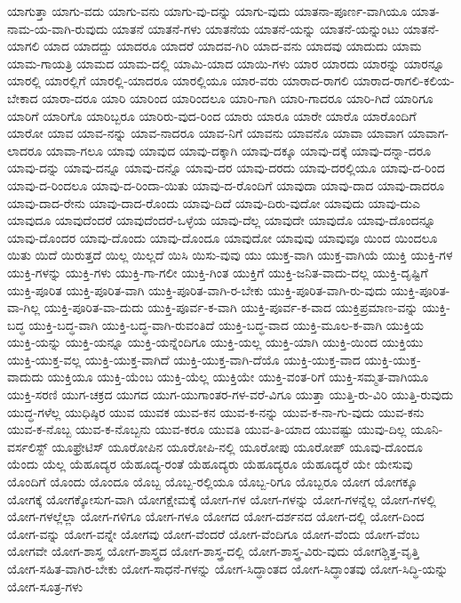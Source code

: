{ಯಾಗುತ್ತಾ
ಯಾಗು-ವದು
ಯಾಗು-ವನು
ಯಾಗು-ವು-ದನ್ನು
ಯಾಗು-ವುದು
ಯಾತನಾ-ಪೂರ್ಣ-ವಾಗಿಯೂ
ಯಾತ-ನಾಮ-ಯ-ವಾಗಿ-ರುವುದು
ಯಾತನೆ
ಯಾತನೆ-ಗಳು
ಯಾತನೆಯ
ಯಾತನೆ-ಯನ್ನು
ಯಾತನೆ-ಯನ್ನುಂಟು
ಯಾತನೆ-ಯಾಗಲಿ
ಯಾದ
ಯಾದದ್ದು
ಯಾದರೂ
ಯಾದರೆ
ಯಾದವ-ಗಿರಿ
ಯಾದ-ವನು
ಯಾದವು
ಯಾದುದು
ಯಾಮ
ಯಾಮ-ಗಾಯತ್ರಿ
ಯಾಮದ
ಯಾಮ-ದಲ್ಲಿ
ಯಾಮಿ-ಯಾದ
ಯಾಯಿ-ಗಳು
ಯಾರ
ಯಾರದು
ಯಾರನ್ನು
ಯಾರನ್ನೂ
ಯಾರಲ್ಲಿ
ಯಾರಲ್ಲಿಗೆ
ಯಾರಲ್ಲಿ-ಯಾದರೂ
ಯಾರಲ್ಲಿಯೂ
ಯಾರ-ವರು
ಯಾರಾದ-ರಾಗಲಿ
ಯಾರಾದ-ರಾಗಲಿ-ಕಲಿಯ-ಬೇಕಾದ
ಯಾರಾ-ದರೂ
ಯಾರಿ
ಯಾರಿಂದ
ಯಾರಿಂದಲೂ
ಯಾರಿ-ಗಾಗಿ
ಯಾರಿ-ಗಾದರೂ
ಯಾರಿ-ಗಿದೆ
ಯಾರಿಗೂ
ಯಾರಿಗೆ
ಯಾರಿಗೊ
ಯಾರಿಬ್ಬರೂ
ಯಾರಿರು-ವುದ-ರಿಂದ
ಯಾರು
ಯಾರೂ
ಯಾರೇ
ಯಾರೊ
ಯಾರೊಂದಿಗೆ
ಯಾರೋ
ಯಾವ
ಯಾವ-ನನ್ನು
ಯಾವ-ನಾದರೂ
ಯಾವ-ನಿಗೆ
ಯಾವನು
ಯಾವನೊ
ಯಾವಾ
ಯಾವಾಗ
ಯಾವಾಗ-ಲಾದರೂ
ಯಾವಾ-ಗಲೂ
ಯಾವು
ಯಾವುದ
ಯಾವು-ದಕ್ಕಾಗಿ
ಯಾವು-ದಕ್ಕೂ
ಯಾವು-ದಕ್ಕೆ
ಯಾವು-ದನ್ನಾ-ದರೂ
ಯಾವು-ದನ್ನು
ಯಾವು-ದನ್ನೂ
ಯಾವು-ದನ್ನೊ
ಯಾವು-ದರ
ಯಾವು-ದರದು
ಯಾವು-ದರಲ್ಲಿಯೂ
ಯಾವು-ದ-ರಿಂದ
ಯಾವು-ದ-ರಿಂದಲೂ
ಯಾವು-ದ-ರಿಂದಾ-ಯಿತು
ಯಾವು-ದ-ರೊಂದಿಗೆ
ಯಾವುದಾ
ಯಾವು-ದಾದ
ಯಾವು-ದಾದರೂ
ಯಾವು-ದಾದ-ರೇನು
ಯಾವು-ದಾದ-ರೊಂದು
ಯಾವು-ದಿದೆ
ಯಾವು-ದಿರು-ವುದೋ
ಯಾವುದು
ಯಾವು-ದುಎ
ಯಾವುದೂ
ಯಾವುದೆಂದರೆ
ಯಾವುದೆಂದರೆ-ಒಳ್ಳೆಯ
ಯಾವು-ದೆಲ್ಲ
ಯಾವುದೇ
ಯಾವುದೊ
ಯಾವು-ದೊಂದನ್ನೂ
ಯಾವು-ದೊಂದರ
ಯಾವು-ದೊಂದು
ಯಾವು-ದೊಂದೂ
ಯಾವುದೋ
ಯಾವುವು
ಯಾವುವೂ
ಯಿಂದ
ಯಿಂದಲೂ
ಯಿತು
ಯಿದೆ
ಯಿರುತ್ತದೆ
ಯಿಲ್ಲ
ಯಿಲ್ಲದೆ
ಯಿಸಿ
ಯಿಸು-ವುವು
ಯು
ಯುಕ್ತ-ವಾಗಿ
ಯುಕ್ತ-ವಾಗಿಯೆ
ಯುಕ್ತಿ
ಯುಕ್ತಿ-ಗಳ
ಯುಕ್ತಿ-ಗಳನ್ನು
ಯುಕ್ತಿ-ಗಳು
ಯುಕ್ತಿ-ಗಾ-ಗಲೀ
ಯುಕ್ತಿ-ಗಿಂತ
ಯುಕ್ತಿಗೆ
ಯುಕ್ತಿ-ಜನಿತ-ವಾದು-ದಲ್ಲ
ಯುಕ್ತಿ-ದೃಷ್ಟಿಗೆ
ಯುಕ್ತಿ-ಪೂರಿತ
ಯುಕ್ತಿ-ಪೂರಿತ-ವಾಗಿ
ಯುಕ್ತಿ-ಪೂರಿತ-ವಾಗಿ-ರ-ಬೇಕು
ಯುಕ್ತಿ-ಪೂರಿತ-ವಾಗಿ-ರು-ವುದು
ಯುಕ್ತಿ-ಪೂರಿತ-ವಾ-ಗಿಲ್ಲ
ಯುಕ್ತಿ-ಪೂರಿತ-ವಾ-ದುದು
ಯುಕ್ತಿ-ಪೂರ್ವ-ಕ-ವಾಗಿ
ಯುಕ್ತಿ-ಪೂರ್ವ-ಕ-ವಾದ
ಯುಕ್ತಿಪ್ರಮಾಣ-ವನ್ನು
ಯುಕ್ತಿ-ಬದ್ಧ
ಯುಕ್ತಿ-ಬದ್ಧ-ವಾಗಿ
ಯುಕ್ತಿ-ಬದ್ಧ-ವಾಗಿ-ರುವಂತಿದೆ
ಯುಕ್ತಿ-ಬದ್ಧ-ವಾದ
ಯುಕ್ತಿ-ಮೂಲ-ಕ-ವಾಗಿ
ಯುಕ್ತಿಯ
ಯುಕ್ತಿ-ಯನ್ನು
ಯುಕ್ತಿ-ಯನ್ನೂ
ಯುಕ್ತಿ-ಯನ್ನೆಂದಿಗೂ
ಯುಕ್ತಿ-ಯಲ್ಲ
ಯುಕ್ತಿ-ಯಾಗಿ
ಯುಕ್ತಿ-ಯಿಂದ
ಯುಕ್ತಿಯು
ಯುಕ್ತಿ-ಯುಕ್ತ-ವಲ್ಲ
ಯುಕ್ತಿ-ಯುಕ್ತ-ವಾಗಿದೆ
ಯುಕ್ತಿ-ಯುಕ್ತ-ವಾಗಿ-ದೆಯೊ
ಯುಕ್ತಿ-ಯುಕ್ತ-ವಾದ
ಯುಕ್ತಿ-ಯುಕ್ತ-ವಾದುದು
ಯುಕ್ತಿಯೂ
ಯುಕ್ತಿ-ಯೆಂಬ
ಯುಕ್ತಿ-ಯೆಲ್ಲ
ಯುಕ್ತಿಯೇ
ಯುಕ್ತಿ-ವಂತ-ರಿಗೆ
ಯುಕ್ತಿ-ಸಮ್ಮತ-ವಾಗಿಯೂ
ಯುಕ್ತಿ-ಸರಣಿ
ಯುಗ-ಚಕ್ರದ
ಯುಗದ
ಯುಗ-ಯುಗಾಂತರ-ಗಳ-ವರೆ-ವಿಗೂ
ಯುತ್ತಾ
ಯುತ್ತಿ-ರು-ವಿರಿ
ಯುತ್ತಿ-ರುವುದು
ಯುದ್ಧ-ಗಳೆಲ್ಲ
ಯುಧಿಷ್ಠಿರ
ಯುವ
ಯುವಕ
ಯುವ-ಕನ
ಯುವ-ಕ-ನನ್ನು
ಯುವ-ಕ-ನಾ-ಗು-ವುದು
ಯುವ-ಕನು
ಯುವ-ಕ-ನೊಬ್ಬ
ಯುವ-ಕ-ನೊಬ್ಬನು
ಯುವ-ಕರೂ
ಯುವತಿ
ಯುವ-ತಿ-ಯಾದ
ಯುವಷ್ಟು
ಯುವು-ದಿಲ್ಲ
ಯೂನಿ-ವರ್ಸಲಿಸ್ಟ್
ಯೂಫ್ರೇಟಿಸ್
ಯೂರೋಪಿನ
ಯೂರೋಪಿ-ನಲ್ಲಿ
ಯೂರೋಪು
ಯೂರೋಪ್
ಯೂವು-ದೊಂದೂ
ಯೆಂದು
ಯೆಲ್ಲ
ಯೆಹೂದ್ಯರ
ಯೆಹೂದ್ಯ-ರಂತೆ
ಯೆಹೂದ್ಯರು
ಯೆಹೂದ್ಯರೂ
ಯೆಹೂದ್ಯರೆ
ಯೇ
ಯೇಸುವು
ಯೊಂದಿಗೆ
ಯೊಂದು
ಯೊಂದೂ
ಯೊಬ್ಬ
ಯೊಬ್ಬ-ರಲ್ಲಿಯೂ
ಯೊಬ್ಬ-ರಿಗೂ
ಯೊಬ್ಬರೂ
ಯೋಗ
ಯೋಗಕ್ಕೂ
ಯೋಗಕ್ಕೆ
ಯೋಗಕ್ಕೋಸುಗ-ವಾಗಿ
ಯೋಗಕ್ಷೇಮಕ್ಕೆ
ಯೋಗ-ಗಳ
ಯೋಗ-ಗಳನ್ನು
ಯೋಗ-ಗಳನ್ನೆಲ್ಲ
ಯೋಗ-ಗಳಲ್ಲಿ
ಯೋಗ-ಗಳಲ್ಲೆಲ್ಲಾ
ಯೋಗ-ಗಳಿಗೂ
ಯೋಗ-ಗಳೂ
ಯೋಗದ
ಯೋಗ-ದರ್ಶನದ
ಯೋಗ-ದಲ್ಲಿ
ಯೋಗ-ದಿಂದ
ಯೋಗ-ವನ್ನು
ಯೋಗ-ವನ್ನೇ
ಯೋಗವು
ಯೋಗ-ವೆಂದರೆ
ಯೋಗ-ವೆಂದಿಗೂ
ಯೋಗ-ವೆಂದು
ಯೋಗ-ವೆಂಬ
ಯೋಗವೇ
ಯೋಗ-ಶಾಸ್ತ್ರ
ಯೋಗ-ಶಾಸ್ತ್ರದ
ಯೋಗ-ಶಾಸ್ತ್ರ-ದಲ್ಲಿ
ಯೋಗ-ಶಾಸ್ತ್ರ-ವಿರು-ವುದು
ಯೋಗಶ್ಚಿತ್ತ-ವೃತ್ತಿ
ಯೋಗ-ಸಹಿತ-ವಾಗಿರ-ಬೇಕು
ಯೋಗ-ಸಾಧನೆ-ಗಳನ್ನು
ಯೋಗ-ಸಿದ್ಧಾಂತದ
ಯೋಗ-ಸಿದ್ಧಾಂತವು
ಯೋಗ-ಸಿದ್ಧಿ-ಯನ್ನು
ಯೋಗ-ಸೂತ್ರ-ಗಳು
}
